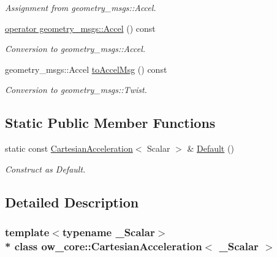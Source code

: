 \begin{DoxyCompactItemize}
\begin{DoxyCompactList}\small\item\em Assignment from geometry\+\_\+msgs\+::\+Accel. \end{DoxyCompactList}\item 
\hyperlink{classow__core_1_1CartesianAcceleration_a8e7cd11ab998220f6ea65970605045b7}{operator geometry\+\_\+msgs\+::\+Accel} () const \hypertarget{classow__core_1_1CartesianAcceleration_a8e7cd11ab998220f6ea65970605045b7}{}\label{classow__core_1_1CartesianAcceleration_a8e7cd11ab998220f6ea65970605045b7}

\begin{DoxyCompactList}\small\item\em Conversion to geometry\+\_\+msgs\+::\+Accel. \end{DoxyCompactList}\item 
geometry\+\_\+msgs\+::\+Accel \hyperlink{classow__core_1_1CartesianAcceleration_a127f662e061666d70174897ac315b834}{to\+Accel\+Msg} () const \hypertarget{classow__core_1_1CartesianAcceleration_a127f662e061666d70174897ac315b834}{}\label{classow__core_1_1CartesianAcceleration_a127f662e061666d70174897ac315b834}

\begin{DoxyCompactList}\small\item\em Conversion to geometry\+\_\+msgs\+::\+Twist. \end{DoxyCompactList}\end{DoxyCompactItemize}
\subsection*{Static Public Member Functions}
\begin{DoxyCompactItemize}
\item 
static const \hyperlink{classow__core_1_1CartesianAcceleration}{Cartesian\+Acceleration}$<$ Scalar $>$ \& \hyperlink{classow__core_1_1CartesianAcceleration_a00e6c34ddc0c10a6e1c591070baa1cfb}{Default} ()
\begin{DoxyCompactList}\small\item\em Construct as Default. \end{DoxyCompactList}\end{DoxyCompactItemize}


\subsection{Detailed Description}
\subsubsection*{template$<$typename \+\_\+\+Scalar$>$\\*
class ow\+\_\+core\+::\+Cartesian\+Acceleration$<$ \+\_\+\+Scalar $>$}

